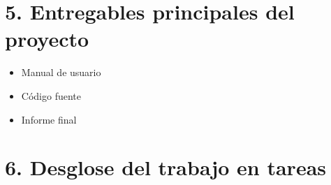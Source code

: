 \documentclass[11pt]{charter}
\begin{document}
\section{5. Entregables principales del proyecto}
\label{sec:entregables}

\begin{itemize}
\item Manual de usuario
\item Código fuente
\item Informe final
\end{itemize}

\section{6. Desglose del trabajo en tareas}
\label{sec:wbs}
\end{document}
